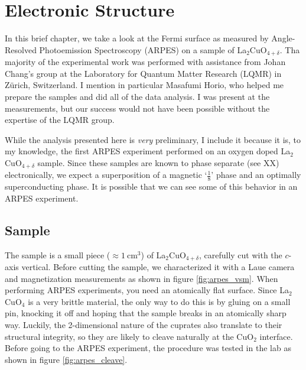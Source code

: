 \chapter{Electronic Structure}\label{ch:arpes}
In this brief chapter, we take a look at the Fermi surface as measured by Angle-Resolved Photoemission Spectroscopy (ARPES) on a sample of La$_2$CuO$_{4+\delta}$. Tha majority of the experimental work was performed with assistance from Johan Chang's group at the Laboratory for Quantum Matter Research (LQMR) in Z\"urich, Switzerland. I mention in particular Masafumi Horio, who helped me prepare the samples and did all of the data analysis. I was present at the measurements, but our success would not have been possible without the expertise of the LQMR group.

While the analysis presented here is \emph{very} preliminary, I include it because it is, to my knowledge, the first ARPES experiment performed on an oxygen doped La$_2$CuO$_{4+\delta}$ sample. Since these samples are known to phase separate (see XX) electronically, we expect a superposition of a magnetic `$\frac{1}{8}$' phase and an optimally superconducting phase. It is possible that we can see some of this behavior in an ARPES experiment.

\section{Sample}
The sample is a small piece ($\approx \SI{1}{\centi\meter\cubed}$) of La$_2$CuO$_{4+\delta}$, carefully cut with the $c$-axis vertical. Before cutting the sample, we characterized it with a Laue camera and magnetization measurements as shown in figure \ref{fig:arpes_vsm}. When performing ARPES experiments, you need an atomically flat surface. Since La$_2$CuO$_4$ is a very brittle material, the only way to do this is by gluing on a small pin, knocking it off and hoping that the sample breaks in an atomically sharp way. Luckily, the 2-dimensional nature of the cuprates also translate to their structural integrity, so they are likely to cleave naturally at the CuO$_2$ interface. Before going to the ARPES experiment, the procedure was tested in the lab as shown in figure \ref{fig:arpes_cleave}.

